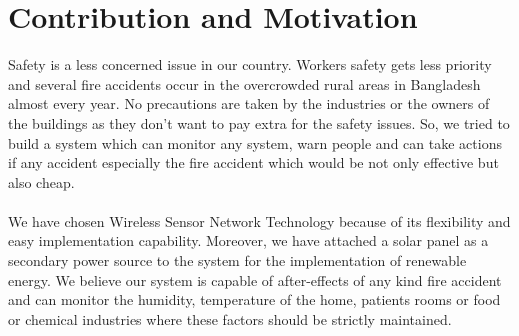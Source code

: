 \section{Contribution and Motivation}
Safety is a less concerned issue in our country. Workers safety gets less priority and several fire accidents occur in the overcrowded rural areas in Bangladesh almost every year. No precautions are taken by the industries or the owners of the buildings as they don't want to pay extra for the safety issues. So, we tried to build a system which can monitor any system, warn people and can take actions if any accident especially the fire accident which would be not only effective but also cheap.\\\\
We have chosen Wireless Sensor Network Technology because of its flexibility and easy implementation capability. Moreover, we have attached a solar panel as a secondary power source to the system for the implementation of renewable energy. We believe our system is capable of after-effects of any kind fire accident and can monitor the humidity, temperature of the home, patients rooms or food or chemical industries where these factors should be strictly maintained.

